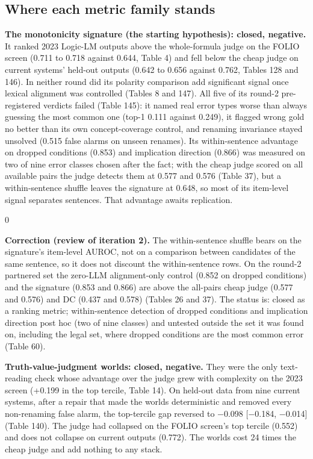 \documentclass[11pt,letterpaper]{article}
\newenvironment{correction}{\par\medskip\noindent\begin{minipage}{\linewidth}\setlength{\fboxsep}{6pt}\begin{lrbox}{0}\begin{minipage}{0.96\linewidth}\small}{\end{minipage}\end{lrbox}\colorbox{black!6}{\usebox{0}}\end{minipage}\par\medskip}
\begin{document}
\subsection{Where each metric family stands}

\textbf{The monotonicity signature (the starting hypothesis): closed, negative.} It ranked 2023 Logic-LM outputs above the whole-formula judge on the FOLIO screen (0.711 to 0.718 against 0.644, Table 4) and fell below the cheap judge on current systems' held-out outputs (0.642 to 0.656 against 0.762, Tables 128 and 146). In neither round did its polarity comparison add significant signal once lexical alignment was controlled (Tables 8 and 147). All five of its round-2 pre-registered verdicts failed (Table 145): it named real error types worse than always guessing the most common one (top-1 0.111 against 0.249), it flagged wrong gold no better than its own concept-coverage control, and renaming invariance stayed unsolved (0.515 false alarms on unseen renames). Its within-sentence advantage on dropped conditions (0.853) and implication direction (0.866) was measured on two of nine error classes chosen after the fact; with the cheap judge scored on all available pairs the judge detects them at 0.577 and 0.576 (Table 37), but a within-sentence shuffle leaves the signature at 0.648, so most of its item-level signal separates sentences. That advantage awaits replication.

\begin{correction}\textbf{Correction (review of iteration 2).} The within-sentence shuffle bears on the signature's item-level AUROC, not on a comparison between candidates of the same sentence, so it does not discount the within-sentence rows. On the round-2 partnered set the zero-LLM alignment-only control (0.852 on dropped conditions) and the signature (0.853 and 0.866) are above the all-pairs cheap judge (0.577 and 0.576) and DC (0.437 and 0.578) (Tables 26 and 37). The status is: closed as a ranking metric; within-sentence detection of dropped conditions and implication direction post hoc (two of nine classes) and untested outside the set it was found on, including the legal set, where dropped conditions are the most common error (Table 60).\end{correction}

\textbf{Truth-value-judgment worlds: closed, negative.} They were the only text-reading check whose advantage over the judge grew with complexity on the 2023 screen (+0.199 in the top tercile, Table 14). On held-out data from nine current systems, after a repair that made the worlds deterministic and removed every non-renaming false alarm, the top-tercile gap reversed to $-$0.098 [$-$0.184, $-$0.014] (Table 140). The judge had collapsed on the FOLIO screen's top tercile (0.552) and does not collapse on current outputs (0.772). The worlds cost 24 times the cheap judge and add nothing to any stack.
\end{document}
